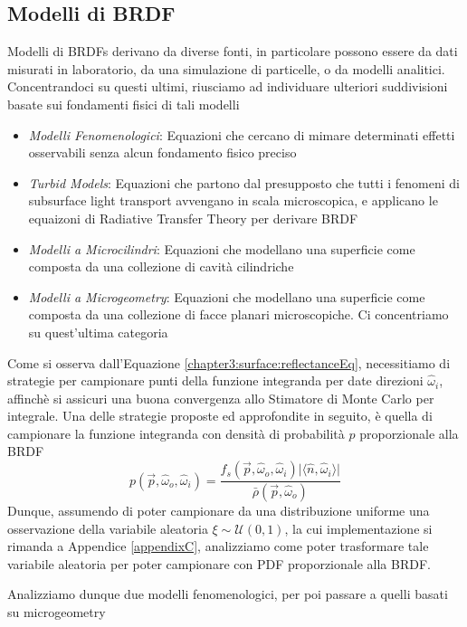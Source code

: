 \subsection{Modelli di BRDF}
Modelli di BRDFs derivano da diverse fonti, in particolare possono essere da dati misurati in laboratorio, da una simulazione di particelle, o da 
modelli analitici. Concentrandoci su questi ultimi, riusciamo ad individuare ulteriori suddivisioni basate sui fondamenti fisici di tali modelli
\begin{itemize}[topsep=0pt, noitemsep]
	\item \textit{Modelli Fenomenologici}: Equazioni che cercano di mimare determinati effetti osservabili senza alcun fondamento fisico preciso
	\item \textit{Turbid Models}: Equazioni che partono dal presupposto che tutti i fenomeni di subsurface light transport avvengano in scala
		microscopica, e applicano le equaizoni di Radiative Transfer Theory per derivare BRDF
	\item \textit{Modelli a Microcilindri}: Equazioni che modellano una superficie come composta da una collezione di cavit\`a cilindriche
	\item \textit{Modelli a Microgeometry}: Equazioni che modellano una superficie come composta da una collezione di facce planari microscopiche.
		Ci concentriamo su quest'ultima categoria
\end{itemize}
Come si osserva dall'Equazione \ref{chapter3:surface:reflectanceEq}, necessitiamo di strategie per campionare punti della funzione integranda per 
date direzioni $\hat{\omega}_i$, affinch\`e si assicuri una buona convergenza allo Stimatore di Monte Carlo per integrale\footnotemark{}. 
Una delle strategie proposte ed approfondite in seguito, \`e quella di campionare la funzione integranda con densit\`a di probabilit\`a $p$ 
proporzionale alla BRDF
\begin{equation}
	p(\vec{p},\hat{\omega}_o,\hat{\omega}_i) = \frac{f_s(\vec{p},\hat{\omega}_o,\hat{\omega}_i)\vert\langle\hat{n},\hat{\omega}_i\rangle\vert}%
		{\bar{\rho}(\vec{p},\hat{\omega}_o)}
\end{equation}
Dunque, assumendo di poter campionare da una distribuzione uniforme una osservazione della variabile aleatoria $\xi\sim\mathcal{U}(0,1)$, la cui 
implementazione si rimanda a Appendice \ref{appendixC}, analizziamo come poter trasformare tale variabile aleatoria per poter campionare con PDF 
proporzionale alla BRDF.\par
Analizziamo dunque due modelli fenomenologici, per poi passare a quelli basati su microgeometry
